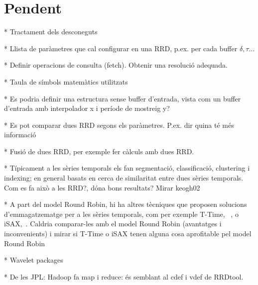 \section{Pendent}


* Tractament dels desconeguts


* Llista de paràmetres que cal configurar en una RRD, p.ex. per cada buffer $\delta,\tau\ldots$

* Definir operacions de consulta (fetch). Obtenir una resolució adequada.

* Taula de símbols matemàtics utilitzats


* Es podria definir una estructura sense buffer d'entrada, vista com un buffer d'entrada amb interpolador x i període de mostreig y?


* Es pot comparar dues RRD segons els paràmetres. P.ex. dir quina té més informació



* Fusió de dues RRD, per exemple fer càlculs amb dues RRD.

* Típicament a les sèries temporals els fan segmentació, classificació, clustering i indexing; en general basats en cerca de similaritat entre dues sèries temporals. Com es fa això a les RRD?, dóna bons resultats? Mirar keogh02~\cite{keogh02} 

* A part del model Round Robin, hi ha altres tècniques que proposen solucions d'emmagatzematge per a les sèries temporals, com per exemple T-Time, ~\cite{assfalg08:ttime}, o iSAX,~\cite{isax}. Caldria comparar-les amb el model Round Robin (avantatges i inconvenients) i mirar si T-Time o iSAX tenen alguna cosa aprofitable pel model Round Robin

* Wavelet packages

* De les JPL: Hadoop fa map i reduce: és semblant al cdef i vdef de RRDtool.





